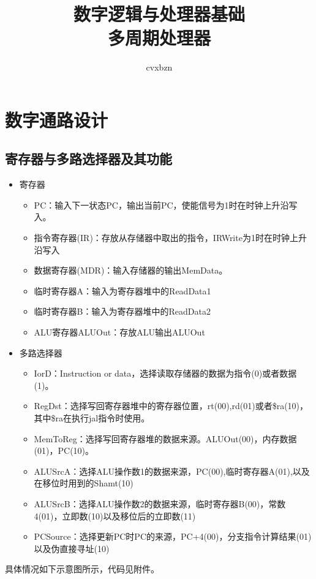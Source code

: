 \documentclass{article}
\title{数字逻辑与处理器基础\\多周期处理器}
\author{cvxbzn}
\begin{document}
\maketitle

\section{数字通路设计}
\subsection{寄存器与多路选择器及其功能}
\begin{itemize}
    \item 寄存器
          \begin{itemize}
              \item PC：输入下一状态PC，输出当前PC，使能信号为1时在时钟上升沿写入。
              \item 指令寄存器(IR)：存放从存储器中取出的指令，IRWrite为1时在时钟上升沿写入
              \item 数据寄存器(MDR)：输入存储器的输出MemData。
              \item 临时寄存器A：输入为寄存器堆中的ReadData1
              \item 临时寄存器B：输入为寄存器堆中的ReadData2
              \item ALU寄存器ALUOut：存放ALU输出ALUOut
          \end{itemize}
    \item 多路选择器
          \begin{itemize}
              \item IorD：Instruction or data，选择读取存储器的数据为指令(0)或者数据(1)。
              \item RegDst：选择写回寄存器堆中的寄存器位置，rt(00),rd(01)或者\$ra(10)，其中\$ra在执行jal指令时使用。
              \item MemToReg：选择写回寄存器堆的数据来源。ALUOut(00)，内存数据(01)，PC(10)。
              \item ALUSrcA：选择ALU操作数1的数据来源，PC(00),临时寄存器A(01),以及在移位时用到的Shamt(10)
              \item ALUSrcB：选择ALU操作数2的数据来源，临时寄存器B(00)，常数4(01)，立即数(10)以及移位后的立即数(11)
              \item PCSource：选择更新PC时PC的来源，PC+4(00)，分支指令计算结果(01)以及伪直接寻址(10)
          \end{itemize}
\end{itemize}
具体情况如下示意图所示，代码见附件。
\end{document}
